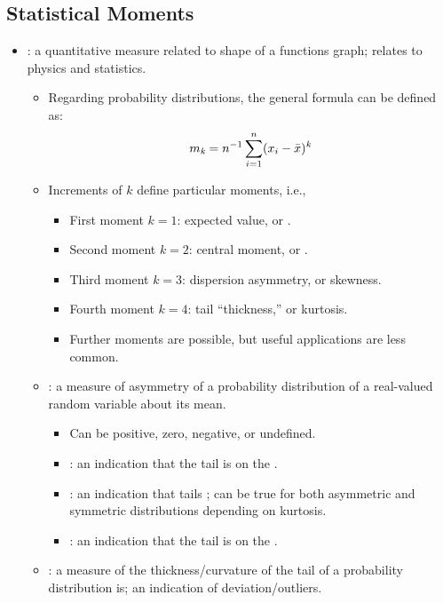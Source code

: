 \begin{itemize}
  \subsection{Statistical Moments}
  \begin{itemize}
    \item {}: a quantitative measure related to shape of a functions graph; relates to physics and statistics.
      \begin{itemize}
        \item Regarding probability distributions, the general formula can be defined as:
        \[%
        m_\emph{k} = n ^{-1} \sum_{i = 1}^{n}(x_i - \bar{x})^\emph{k}
        \]%
        \item Increments of \(k\) define particular moments, i.e.,
          \begin{itemize}
            \item First moment \(k=1\): expected value, or \hyperref[Subsection: Measures of Central Tendency]{}.
            \item Second moment \(k=2\): central moment, or \hyperref[Subsection: Measures of Dispersion]{}.
            \item Third moment \(k=3\): dispersion asymmetry, or skewness.
            \item Fourth moment \(k=4\): tail ``thickness,'' or kurtosis.
            \item Further moments are possible, but useful applications are less common.
          \end{itemize}
        \item {}: a measure of asymmetry of a probability distribution of a real-valued random variable about its mean.
          \begin{itemize}
            \item Can be positive, zero, negative, or undefined.
            \item {}: an indication that the tail is on the .
            \item {}: an indication that tails ; can be true for both asymmetric and symmetric distributions depending on kurtosis.
            \item {}: an indication that the tail is on the . 
          \end{itemize}
        \item {}: a measure of the thickness/curvature of the tail of a probability distribution is; an indication of deviation/outliers.

\end{itemize}
\end{itemize}
\end{itemize}
